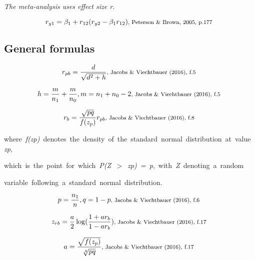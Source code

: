 \documentclass{article}
\begin{document}
\vspace{3mm}
\textit{The meta-analysis uses effect size r.}

\begin{equation*}
r_{y1} = \beta_{1} + r_{12}(r_{y2}-\beta_{1}r_{12}) \mbox{\footnotesize, Peterson \& Brown, 2005, p.177 } 
\end{equation*}

\subsection*{General formulas}

\begin{equation*}
r_{pb}= \frac {d}{\sqrt{d^{2}+h}}  \mbox{\footnotesize, Jacobs \& Viechtbauer (2016), f.5  }
\end{equation*}

\begin{equation*}
h = \frac{m}{n_{1}}  + \frac{m}{n_{0}},  m = n_{1} + n_{0} - 2  \mbox{\footnotesize, Jacobs \& Viechtbauer (2016), f.5  }
\end{equation*}

\begin{equation*}
r_{b} = \frac{\sqrt{pq}}{f(z_{p})}r_{pb} \mbox{\footnotesize, Jacobs \& Viechtbauer (2016), f.8  }
\end{equation*}

\mbox {\footnotesize where \textit{f(zp)} denotes the density of the standard normal distribution at value \textit{zp}, }

\mbox {\footnotesize which is the point for which \textit{P(Z $>$ zp) = p}, with \textit{Z} denoting a random  }

\mbox {\footnotesize variable following a standard normal distribution. }

\begin{equation*}
p = \frac{n_{1}}{n}, q = 1 - p \mbox{\footnotesize, Jacobs \& Viechtbauer (2016), f.6  }
\end{equation*}

\begin{equation*}
z_{rb}= \frac{a}{2} \log (\frac{1+ar_{b}}{1-ar_{b}})  \mbox{\footnotesize,  Jacobs \& Viechtbauer (2016), f.17  }
\end{equation*}

\begin{equation*}
a = \frac{\sqrt{f(z_{p})}}{\sqrt[4]{pq}}  \mbox{\footnotesize,  Jacobs \& Viechtbauer (2016), f.17  }
\end{equation*}
\end{document}
